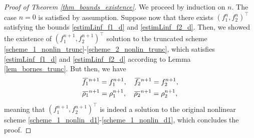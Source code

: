 \documentclass[reqno]{amsart}
\newcommand{\overbar}[1]{\mkern 1.5mu\overline{\mkern-1.5mu#1\mkern-1.5mu}\mkern 1.5mu}
\numberwithin{equation}{section}
\begin{document}
\begin{proof}[Proof of Theorem \ref{thm_bounds_existence}]
    We proceed by induction on $n$. The case $n=0$ is satisfied by assumption. Suppose now that there exists $(f_1^n,f_2^n)^\top$ satisfying the bounds \eqref{estimLinf_f1_d} and \eqref{estimLinf_f2_d}. Then, we showed the existence of $(f_1^{n+1},f_2^{n+1})^\top$ solution to the truncated scheme \eqref{scheme_1_nonlin_trunc}-\eqref{scheme_2_nonlin_trunc}, which satisfies \eqref{estimLinf_f1_d} and \eqref{estimLinf_f2_d} according to Lemma \ref{lem_bornes_trunc}. But then, we have
    \begin{align*}
        &\overbar{f_1}^{n+1} = f_1^{n+1},\quad \overbar{f_2}^{n+1} = f_2^{n+1},\\
        &\overbar{\rho_1}^{n+1} = \rho_1^{n+1},\quad \overbar{\rho_2}^{n+1} = \rho_2^{n+1},
    \end{align*}
    meaning that $(f_1^{n+1},f_2^{n+1})^\top$ is indeed a solution to the original nonlinear scheme \eqref{scheme_1_nonlin_d1}-\eqref{scheme_1_nonlin_d1}, which concludes the proof.
\end{proof}
\end{document}

